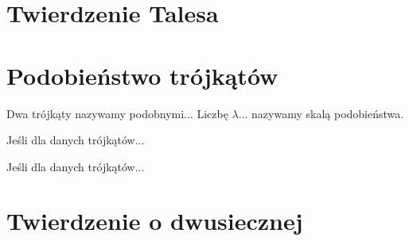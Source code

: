 
\section{Twierdzenie Talesa}


\section{Podobieństwo trójkątów}
\begin{definition}
	Dwa trójkąty nazywamy podobnymi...
	Liczbę $\lambda$... nazywamy skalą podobieństwa.
\end{definition}

\begin{proposition}
	Jeśli dla danych trójkątów...
\end{proposition}

\begin{proposition}
	Jeśli dla danych trójkątów...
\end{proposition}




\section{Twierdzenie o dwusiecznej}


